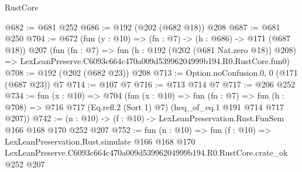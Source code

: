 \begin{lexlean}{RustCore}
\begin{coremodule}
@682 := @681 @252
@686 := @192 (@202 (@682 @18)) @208
@687 := @681 @250
@704 := @672
    (fun (y : @10) => (fn : @7) -> (h : @686) -> @171 (@687 @18))
    @207
    (fun (fn : @7) =>
    fun (h : @192 (@202 (@681 Nat.zero @18)) @208) =>
    LexLeanPreserve.C6093c664c470a009d53996204999b194.R0.RustCore.fun0)
@708 := @192 (@202 (@682 @23)) @208
@713 := Option.noConfusion.{0, 0} (@171 (@687 @23)) @7
@714 := @107 @7
@716 := @713 @714 @7
@717 := @206 @252
@734 := fun (x : @10) =>
  @704
    (fun (x : @10) =>
    fun (fn : @7) =>
    fun (h : @708) => @716 @717 (Eq.refl.{2} (Sort 1) @7) (heq_of_eq.{1} @191 @714 @717 @207))
@742 := (n : @10) -> (f : @10) -> LexLeanPreservation.Rust.FunSem @166 @168 @170 @252 @207
@752 := fun (n : @10) =>
  fun (f : @10) =>
  LexLeanPreservation.Rust.simulate
    @166
    @168
    @170
    LexLeanPreserve.C6093c664c470a009d53996204999b194.R0.RustCore.crate_ok
    @252
    @207
\end{coremodule}
\end{lexlean}
